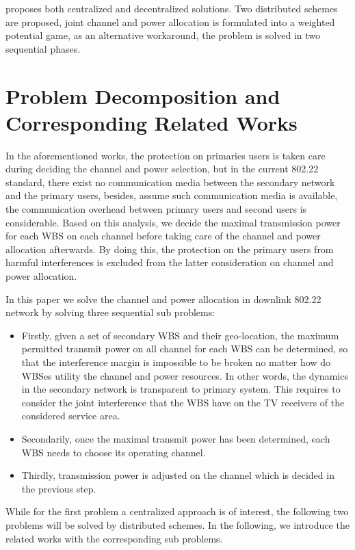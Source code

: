 \cite{joint_power_channel_linkpair_08ICT} proposes both centralized and decentralized solutions.
Two distributed schemes are proposed, joint channel and power allocation is formulated into a weighted potential game, as an alternative workaround, the problem is solved in two sequential phases.

\section{Problem Decomposition and Corresponding Related Works}
In the aforementioned works, the protection on primaries users is taken care during deciding the channel and power selection, but in the current 802.22 standard, there exist no communication media between the secondary network and the primary users, besides, assume such communication media is available, the communication overhead between primary users and second users is considerable.
Based on this analysis, we decide the maximal transmission power for each WBS on each channel before taking care of the channel and power allocation afterwards.
By doing this, the protection on the primary users from harmful interferences is excluded from the latter consideration on channel and power allocation.


In this paper we solve the channel and power allocation in downlink 802.22 network by solving three sequential sub problems:
\begin{itemize}
\item  Firstly, given a set of secondary WBS and their geo-location, the maximum permitted transmit power on all channel for each WBS can be determined, so that the interference margin is impossible to be broken no matter how do WBSes utility the channel and power resources. 
In other words, the dynamics in the secondary network is transparent to primary system. 
This requires to consider the joint interference that the WBS have on the TV receivers of the considered service area. 
\item Secondarily, once the maximal transmit power has been determined, each WBS needs to choose its operating channel. 
\item Thirdly, transmission power is adjusted on the channel which is decided in the previous step.
\end{itemize}
While for the first problem a centralized approach is of interest, the following two problems will be solved by distributed schemes.
In the following, we introduce the related works with the corresponding sub problems.

